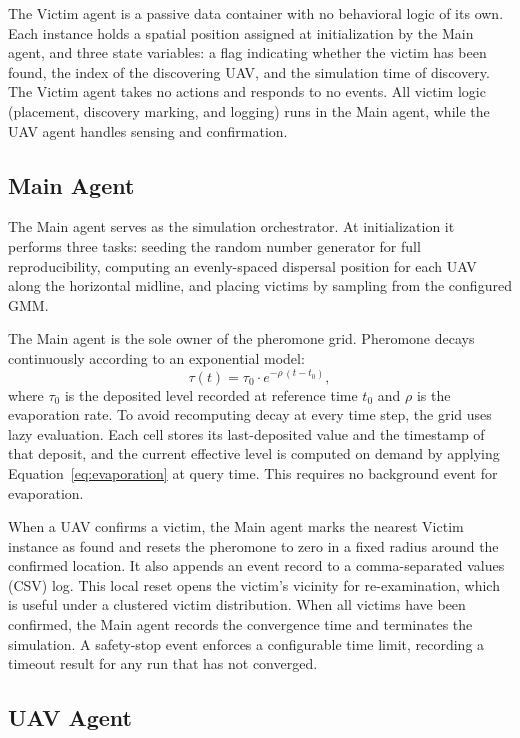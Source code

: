 \documentclass[10pt,a4paper,twocolumn]{article}
\begin{document}
The Victim agent is a passive data container with no behavioral logic of its own. Each instance holds a spatial position assigned at initialization by the Main agent, and three state variables: a flag indicating whether the victim has been found, the index of the discovering UAV, and the simulation time of discovery. The Victim agent takes no actions and responds to no events. All victim logic (placement, discovery marking, and logging) runs in the Main agent, while the UAV agent handles sensing and confirmation.

\subsection{Main Agent}

The Main agent serves as the simulation orchestrator. At initialization it performs three tasks: seeding the random number generator for full reproducibility, computing an evenly-spaced dispersal position for each UAV along the horizontal midline, and placing victims by sampling from the configured GMM.

The Main agent is the sole owner of the pheromone grid. Pheromone decays continuously according to an exponential model:
\begin{equation}
    \tau(t) = \tau_0 \cdot e^{-\rho\,(t - t_0)},
    \label{eq:evaporation}
\end{equation}
where $\tau_0$ is the deposited level recorded at reference time $t_0$ and $\rho$ is the evaporation rate. To avoid recomputing decay at every time step, the grid uses lazy evaluation. Each cell stores its last-deposited value and the timestamp of that deposit, and the current effective level is computed on demand by applying Equation~\eqref{eq:evaporation} at query time. This requires no background event for evaporation.

When a UAV confirms a victim, the Main agent marks the nearest Victim instance as found and resets the pheromone to zero in a fixed radius around the confirmed location. It also appends an event record to a comma-separated values (CSV) log. This local reset opens the victim's vicinity for re-examination, which is useful under a clustered victim distribution. When all victims have been confirmed, the Main agent records the convergence time and terminates the simulation. A safety-stop event enforces a configurable time limit, recording a timeout result for any run that has not converged.

\subsection{UAV Agent}
\label{sec:uav}
\end{document}
